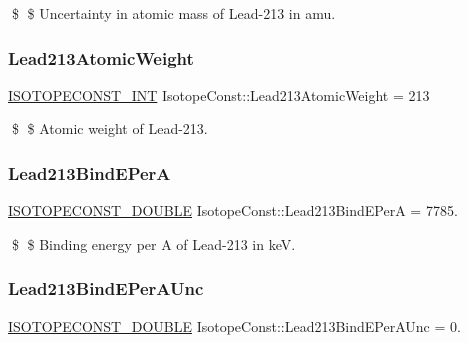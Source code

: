\$ \$ Uncertainty in atomic mass of Lead-\/213 in amu. \mbox{\label{group___isotope_const-_lead-_pb213_gaba0809692e972778adaaf837d68f4e4c}} 
\subsubsection{\texorpdfstring{Lead213\+Atomic\+Weight}{Lead213AtomicWeight}}
{\footnotesize\ttfamily \mbox{\hyperlink{group___isotope_const-_macros_ga5f18360b3e99483a35c32d789e62621c}{I\+S\+O\+T\+O\+P\+E\+C\+O\+N\+S\+T\+\_\+\+I\+NT}} Isotope\+Const\+::\+Lead213\+Atomic\+Weight = 213}

\$ \$ Atomic weight of Lead-\/213. \mbox{\label{group___isotope_const-_lead-_pb213_ga5ca4c8cab646db12106920f8ba2a6997}} 
\subsubsection{\texorpdfstring{Lead213\+Bind\+E\+PerA}{Lead213BindEPerA}}
{\footnotesize\ttfamily \mbox{\hyperlink{group___isotope_const-_macros_ga8f45a7272ce02c0b4c65c44636ed719a}{I\+S\+O\+T\+O\+P\+E\+C\+O\+N\+S\+T\+\_\+\+D\+O\+U\+B\+LE}} Isotope\+Const\+::\+Lead213\+Bind\+E\+PerA = 7785.}

\$ \$ Binding energy per A of Lead-\/213 in keV. \mbox{\label{group___isotope_const-_lead-_pb213_ga952953ad8116b59d39a2a76f9fda1640}} 
\subsubsection{\texorpdfstring{Lead213\+Bind\+E\+Per\+A\+Unc}{Lead213BindEPerAUnc}}
{\footnotesize\ttfamily \mbox{\hyperlink{group___isotope_const-_macros_ga8f45a7272ce02c0b4c65c44636ed719a}{I\+S\+O\+T\+O\+P\+E\+C\+O\+N\+S\+T\+\_\+\+D\+O\+U\+B\+LE}} Isotope\+Const\+::\+Lead213\+Bind\+E\+Per\+A\+Unc = 0.}


